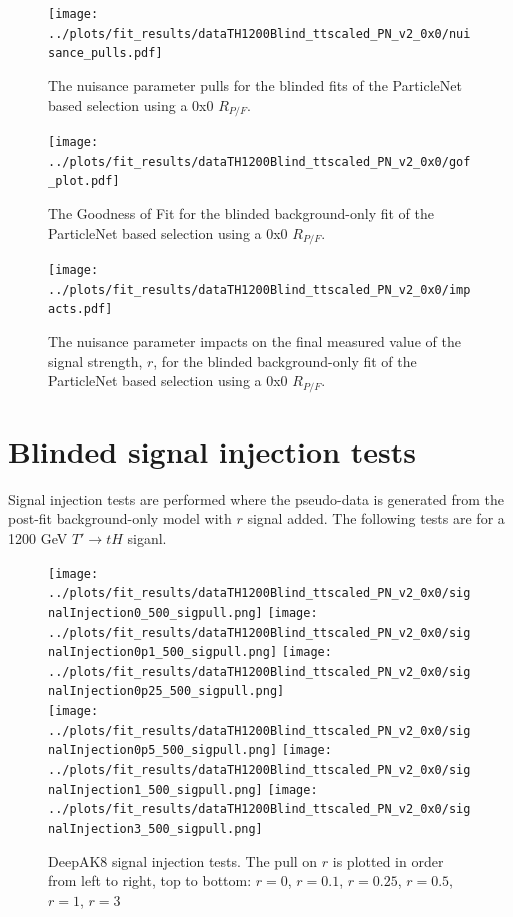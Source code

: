 \documentclass[10pt,oneside]{article}
\begin{document}
\begin{figure}[H]
    \centering
    \texttt{[image: ../plots/fit\_results/dataTH1200Blind\_ttscaled\_PN\_v2\_0x0/nuisance\_pulls.pdf]}
    \caption{The nuisance parameter pulls for the blinded fits of the ParticleNet based selection using a 0x0 $R_{P/F}$.}
    \label{figs:PN_nuis}
\end{figure}
\begin{figure}[H]
    \centering
    \texttt{[image: ../plots/fit\_results/dataTH1200Blind\_ttscaled\_PN\_v2\_0x0/gof\_plot.pdf]}
    \caption{The Goodness of Fit for the blinded background-only fit of the ParticleNet based selection using a 0x0 $R_{P/F}$.}
    \label{figs:PN_gof}
\end{figure}
\begin{figure}[H]
    \texttt{[image: ../plots/fit\_results/dataTH1200Blind\_ttscaled\_PN\_v2\_0x0/impacts.pdf]}
    \caption{The nuisance parameter impacts on the final measured value of the signal strength, $r$, for the blinded
    background-only fit of the ParticleNet based selection using a 0x0 $R_{P/F}$.}
    \label{figs:PN_impacts}
\end{figure}

\section{Blinded signal injection tests}

Signal injection tests are performed where the pseudo-data is generated from the post-fit background-only
model with $r$ signal added. The following tests are for a 1200 GeV $T' \to tH$ siganl.

\begin{figure}[H]
    \centering
    \texttt{[image: ../plots/fit\_results/dataTH1200Blind\_ttscaled\_PN\_v2\_0x0/signalInjection0\_500\_sigpull.png]}
    \texttt{[image: ../plots/fit\_results/dataTH1200Blind\_ttscaled\_PN\_v2\_0x0/signalInjection0p1\_500\_sigpull.png]}
    \texttt{[image: ../plots/fit\_results/dataTH1200Blind\_ttscaled\_PN\_v2\_0x0/signalInjection0p25\_500\_sigpull.png]}\\
    \texttt{[image: ../plots/fit\_results/dataTH1200Blind\_ttscaled\_PN\_v2\_0x0/signalInjection0p5\_500\_sigpull.png]}
    \texttt{[image: ../plots/fit\_results/dataTH1200Blind\_ttscaled\_PN\_v2\_0x0/signalInjection1\_500\_sigpull.png]}
    \texttt{[image: ../plots/fit\_results/dataTH1200Blind\_ttscaled\_PN\_v2\_0x0/signalInjection3\_500\_sigpull.png]}
    \caption{DeepAK8 signal injection tests. The pull on $r$ is plotted in order from left to right, top to bottom: $r=0$, $r=0.1$, $r=0.25$, $r=0.5$, $r=1$, $r=3$}
    \label{figs:sigInjDAK8}
\end{figure}
\end{document}
